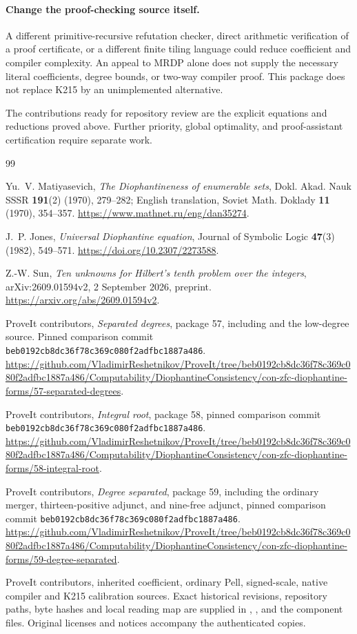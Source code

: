 \documentclass[11pt,a4paper]{article}
\numberwithin{equation}{section}
\newcommand{\snapshot}{\texttt{beb0192cb8dc36f78c369c080f2adfbc1887a486}}
\begin{document}
\paragraph{Change the proof-checking source itself.}
A different primitive-recursive refutation checker, direct arithmetic
verification of a proof certificate, or a different finite tiling language
could reduce coefficient and compiler complexity. An appeal to MRDP alone
does not supply the necessary literal coefficients, degree bounds, or
two-way compiler proof. This package does not replace K215 by an
unimplemented alternative.

The contributions ready for repository review are the explicit equations
and reductions proved above. Further priority, global optimality, and
proof-assistant certification require separate work.

\begin{thebibliography}{99}
\raggedright
{}
Yu.~V. Matiyasevich,
\emph{The Diophantineness of enumerable sets},
Dokl. Akad. Nauk SSSR \textbf{191}(2) (1970), 279--282;
English translation, Soviet Math. Doklady \textbf{11} (1970), 354--357.
\url{https://www.mathnet.ru/eng/dan35274}.

J.~P. Jones, \emph{Universal Diophantine equation},
Journal of Symbolic Logic \textbf{47}(3) (1982), 549--571.
\url{https://doi.org/10.2307/2273588}.

Z.-W. Sun, \emph{Ten unknowns for Hilbert's tenth problem over the integers},
arXiv:2609.01594v2, 2 September 2026, preprint.
\url{https://arxiv.org/abs/2609.01594v2}.

ProveIt contributors, \emph{Separated degrees}, package 57,
including  and the low-degree source.
Pinned comparison commit \snapshot.
\url{https://github.com/VladimirReshetnikov/ProveIt/tree/beb0192cb8dc36f78c369c080f2adfbc1887a486/Computability/DiophantineConsistency/con-zfc-diophantine-forms/57-separated-degrees}.

ProveIt contributors, \emph{Integral root}, package 58,
pinned comparison commit \snapshot.
\url{https://github.com/VladimirReshetnikov/ProveIt/tree/beb0192cb8dc36f78c369c080f2adfbc1887a486/Computability/DiophantineConsistency/con-zfc-diophantine-forms/58-integral-root}.

ProveIt contributors, \emph{Degree separated}, package 59,
including the ordinary merger, thirteen-positive adjunct, and nine-free
adjunct, pinned comparison commit \snapshot.
\url{https://github.com/VladimirReshetnikov/ProveIt/tree/beb0192cb8dc36f78c369c080f2adfbc1887a486/Computability/DiophantineConsistency/con-zfc-diophantine-forms/59-degree-separated}.

ProveIt contributors, inherited coefficient, ordinary Pell, signed-scale,
native compiler and K215 calibration sources. Exact historical revisions,
repository paths, byte hashes and local reading map are supplied in
,
, and the component
 files. Original licenses and notices accompany
the authenticated copies.
\end{thebibliography}
\end{document}
